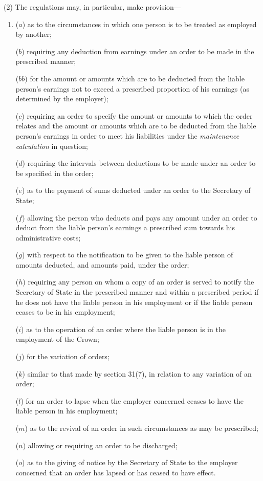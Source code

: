\documentclass[12pt,a4paper]{article}
\begin{document}
(2) The regulations may, in particular, make provision—
\begin{enumerate}\item[]
($a$) as to the circumstances in which one person is to be treated as employed by another;

($b$) requiring any deduction from earnings under an order to be made in the prescribed manner;

($bb$) for the amount or amounts which are to be deducted from the liable person’s earnings not to exceed a prescribed proportion of his earnings (as determined by the employer);

($c$) requiring an order to specify the amount or amounts to which the order relates and the amount or amounts which are to be deducted from the liable person’s earnings in order to meet his liabilities under the 
\emph{maintenance calculation}  %
in question;

($d$) requiring the intervals between deductions to be made under an order to be specified in the order;

($e$) as to the payment of sums deducted under an order to the Secretary of State;

($f$) allowing the person who deducts and pays any amount under an order to deduct from the liable person’s earnings a prescribed sum towards his administrative costs;

($g$) with respect to the notification to be given to the liable person of amounts deducted, and amounts paid, under the order;

($h$) requiring any person on whom a copy of an order is served to notify the Secretary of State in the prescribed manner and within a prescribed period if he does not have the liable person in his employment or if the liable person ceases to be in his employment;

($i$) as to the operation of an order where the liable person is in the employment of the Crown;

($j$) for the variation of orders;

($k$) similar to that made by section 31(7), in relation to any variation of an order;

($l$) for an order to lapse when the employer concerned ceases to have the liable person in his employment;

($m$) as to the revival of an order in such circumstances as may be prescribed;

($n$) allowing or requiring an order to be discharged;

($o$) as to the giving of notice by the Secretary of State to the employer concerned that an order has lapsed or has ceased to have effect.
\end{enumerate}
\end{document}
